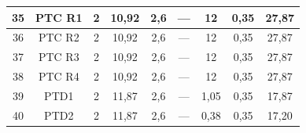 \documentclass[	DIV=calc,%
							paper=a4,%
							fontsize=12pt,%
							onecolumn]{scrartcl}	 					%
\begin{document}
{\begin{tabular}{|c|c|c|c|c|c|c|c|c|}
	35                 & PTC R1             & 2                                                    & 10,92                                       & 2,6                                           & ---                                           & 12                                               & 0,35                                            & 27,87                                                             \\ \hline
	36                 & PTC R2             & 2                                                    & 10,92                                       & 2,6                                           & ---                                           & 12                                               & 0,35                                            & 27,87                                                             \\ \hline
	37                 & PTC R3             & 2                                                    & 10,92                                       & 2,6                                           & ---                                           & 12                                               & 0,35                                            & 27,87                                                             \\ \hline
	38                 & PTC R4             & 2                                                    & 10,92                                       & 2,6                                           & ---                                           & 12                                               & 0,35                                            & 27,87                                                             \\ \hline
	39                 & PTD1               & 2                                                    & 11,87                                       & 2,6                                           & ---                                           & 1,05                                             & 0,35                                            & 17,87                                                             \\ \hline
	40                 & PTD2               & 2                                                    & 11,87                                       & 2,6                                           & ---                                           & 0,38                                             & 0,35                                            & 17,20                                                             \\ \hline

\end{tabular}}
\end{document}
